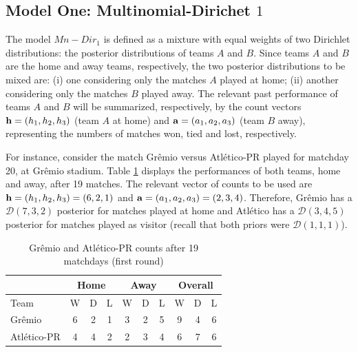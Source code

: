 \documentclass[journal,article,accept,moreauthors,pdftex,12pt,a4paper]{mdpi}
\begin{document}
\subsection{Model One: Multinomial-Dirichet $1$}
\label{sec::Mn_Dir1}

The model $Mn-Dir_1$ is defined as a mixture with equal weights of two Dirichlet distributions: the posterior distributions of teams $A$ and $B$. 
Since teams $A$ and $B$ are the home and away teams, respectively, the two posterior distributions to be mixed are: (i) one considering only the matches $A$ played at home; (ii) another considering only the matches $B$ played away. 
The relevant past performance of teams $A$ and $B$ will be summarized, respectively, by the count vectors ${\bf h} = (h_1, h_2, h_3)$ (team $A$ at home) and ${\bf a} = (a_1, a_2, a_3)$ (team $B$ away), representing the numbers of matches won, tied and lost, respectively.

For instance, consider the match Gr\^emio versus Atl\'etico-PR played for matchday 20, at Gr\^emio stadium. Table \ref{tab:counts} displays the performances of both teams, home and away, after 19
matches. The relevant vector of counts to be used are ${\bf h}=(h_1,h_2,h_3)=(6,2,1)$ and ${\bf a}=(a_1,a_2,a_3)=(2,3,4)$. 
Therefore, Gr\^emio has a $\mathcal{D}(7,3,2)$ posterior for matches played at home and Atl\'etico has a $\mathcal{D}(3,4,5)$ posterior for matches played as visitor (recall that both priors were
$\mathcal{D}(1,1,1)$).

\begin{table}[!h]
\begin{center}
\begin{tabular}{lccccccccc}

\hline
 & \multicolumn{3}{c}{Home} & \multicolumn{3}{c}{Away}& \multicolumn{3}{c}{Overall} \\
\hline
\hline
Team & W & D & L & W & D & L & W & D & L\\
\hline
Gr\^emio & 6 & 2 & 1 & 3 & 2 & 5 & 9 & 4 & 6\\
Atl\'etico-PR & 4 & 4 & 2 & 2 & 3 & 4 & 6 & 7 & 6\\
\hline
\end{tabular}
\caption{Gr\^emio and Atl\'etico-PR counts after 19 matchdays (first round)}\label{tab:counts}
\end{center}
\end{table}
\end{document}
